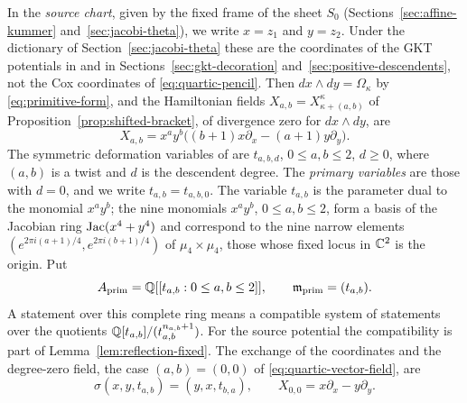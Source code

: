 In the \emph{source chart}, given by the fixed frame of the sheet $S_0$
(Sections~\ref{sec:affine-kummer} and~\ref{sec:jacobi-theta}), we write
$x=z_1$ and $y=z_2$.  Under the dictionary of Section~\ref{sec:jacobi-theta}
these are the coordinates of the GKT potentials in \cite{grossetal2022open}
and in Sections~\ref{sec:gkt-decoration} and~\ref{sec:positive-descendents},
not the Cox coordinates of \eqref{eq:quartic-pencil}.  Then
$dx\wedge dy=\Omega_\kappa$ by \eqref{eq:primitive-form}, and the
Hamiltonian fields $X_{a,b}=X^\kappa_{\kappa+(a,b)}$ of
Proposition~\ref{prop:shifted-bracket}, of divergence zero for
$dx\wedge dy$, are
\begin{equation}\label{eq:quartic-vector-field}
 X_{a,b}
 =x^ay^b\bigl((b+1)x\partial_x-(a+1)y\partial_y\bigr).
\end{equation}
The symmetric deformation variables of \cite[Def.~4.10]{grossetal2022open}
are $t_{a,b,d}$, $0\leq a,b\leq2$, $d\geq0$, where $(a,b)$ is a twist and $d$
is the descendent degree.  The \emph{primary variables} are those with $d=0$,
and we write
$t_{a,b}=t_{a,b,0}$.  The variable $t_{a,b}$ is the parameter dual to the
monomial $x^ay^b$; the nine monomials $x^ay^b$, $0\leq a,b\leq2$, form a basis
of the Jacobian ring $\operatorname{Jac}(x^4+y^4)$ and correspond to the nine narrow
elements $(e^{2\pi i(a+1)/4},e^{2\pi i(b+1)/4})$ of $\mu_4\times\mu_4$,
those whose fixed locus in $\mathbb C^2$ is the origin.  Put
\begin{equation}\label{eq:primary-base}
 A_{\mathrm{prim}}
 =\mathbb Q[[t_{a,b}:0\leq a,b\leq2]],
 \qquad \mathfrak m_{\mathrm{prim}}=(t_{a,b}).
\end{equation}
A statement over this complete ring means a compatible system of statements
over the quotients $\mathbb Q[t_{a,b}]/(t_{a,b}^{n_{a,b}+1})$.  For the source
potential the compatibility is part of Lemma~\ref{lem:reflection-fixed}.
The exchange of the coordinates and the degree-zero field, the case
$(a,b)=(0,0)$ of \eqref{eq:quartic-vector-field}, are
\begin{equation}\label{eq:reflection}
 \sigma(x,y,t_{a,b})=(y,x,t_{b,a}),
 \qquad
 X_{0,0}=x\partial_x-y\partial_y .
\end{equation}

